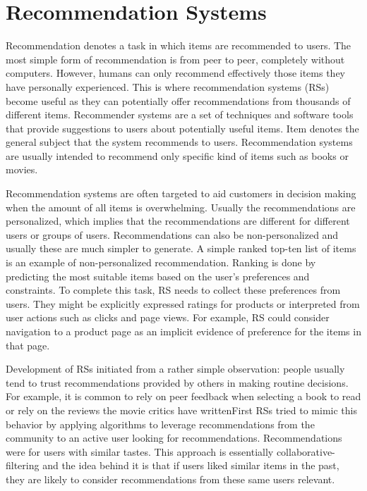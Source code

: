 \documentclass[main.tex]{thesis.tex}
\begin{document}
\chapter{Recommendation Systems}

Recommendation denotes a task in which items are recommended to users.
The most simple form of recommendation is from peer to peer, completely without computers.
However, humans can only recommend effectively those items they have personally experienced.
This is where recommendation systems (RSs) become useful as they can potentially offer recommendations from thousands of different items.
Recommender systems are a set of techniques and software tools that provide suggestions to users about potentially useful items.
Item denotes the general subject that the system recommends to users.
Recommendation systems are usually intended to recommend only specific kind of items such as books or movies. \cite{ricci11}

Recommendation systems are often targeted to aid customers in decision making when the amount of all items is overwhelming.
Usually the recommendations are personalized, which implies that the recommendations are different for different users or groups of users.
Recommendations can also be non-personalized and usually these are much simpler to generate.
A simple ranked top-ten list of items is an example of non-personalized recommendation.
Ranking is done by predicting the most suitable items based on the user's preferences and constraints.
To complete this task, RS needs to collect these preferences from users.
They might be explicitly expressed ratings for products or interpreted from user actions such as clicks and page views. For example, RS could consider navigation to a product page as an implicit evidence of preference for the items in that page. \cite{ricci11}

Development of RSs initiated from a rather simple observation: people usually tend to trust recommendations provided by others in making routine decisions.
For example, it is common to rely on peer feedback when selecting a book to read or rely on the reviews the movie critics have writtenFirst RSs tried to mimic this behavior by applying algorithms to leverage recommendations from the community to an active user looking for recommendations. Recommendations were for users with similar tastes. This approach is essentially collaborative-filtering and the idea behind it is that if users liked similar items in the past, they are likely to consider recommendations from these same users relevant. \cite{ricci11}
\end{document}
